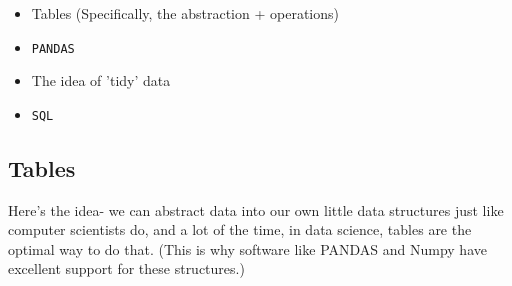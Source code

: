 \documentclass[english, 10pt]{article}
\begin{document}
\begin{itemize}
	\item Tables (Specifically, the abstraction + operations)
	\item \texttt{PANDAS}
	\item The idea of 'tidy' data
	\item \texttt{SQL}
\end{itemize}

\subsection{Tables}

Here's the idea- we can abstract data into our own little data structures just like computer scientists do, and a lot of the time, in data science, tables are the optimal way to do that. (This is why software like PANDAS and Numpy have excellent support for these structures.)\\
\end{document}
